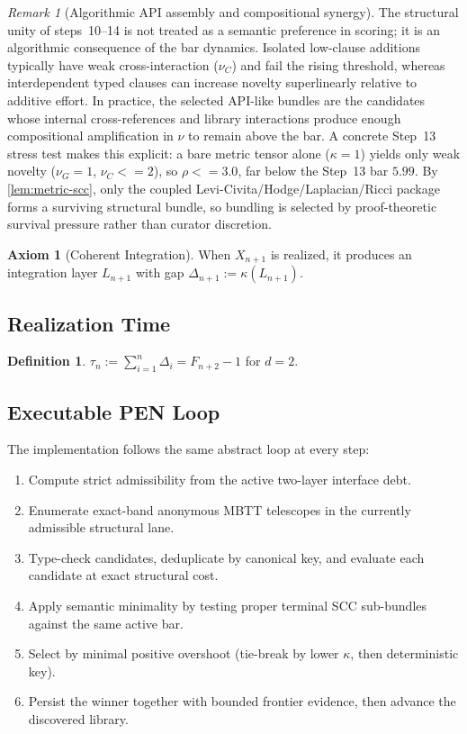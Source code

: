 \documentclass[11pt,a4paper]{article}
\def\leq{<=}%
\theoremstyle{plain}
\theoremstyle{definition}
\newtheorem{definition}[theorem]{Definition}
\newtheorem{axiom}[theorem]{Axiom}
\theoremstyle{remark}
\newtheorem{remark}[theorem]{Remark}
\begin{document}
\begin{remark}[Algorithmic API assembly and compositional synergy]
\label{rem:api-assembly}
The structural unity of steps~10--14 is not treated as a semantic preference in scoring; it is an algorithmic consequence of the bar dynamics.
Isolated low-clause additions typically have weak cross-interaction ($\nu_C$) and fail the rising threshold, whereas interdependent typed clauses can increase novelty superlinearly relative to additive effort.
In practice, the selected API-like bundles are the candidates whose internal cross-references and library interactions produce enough compositional amplification in $\nu$ to remain above the bar.
A concrete Step~13 stress test makes this explicit: a bare metric tensor alone ($\kappa=1$) yields only weak novelty ($\nu_G=1$, $\nu_C\leq 2$), so $\rho\leq 3.0$, far below the Step~13 bar $5.99$.
By \cref{lem:metric-scc}, only the coupled Levi-Civita/Hodge/Laplacian/Ricci package forms a surviving structural bundle, so bundling is selected by proof-theoretic survival pressure rather than curator discretion.
\end{remark}

\begin{axiom}[Coherent Integration]
\label{ax:integration}
When $X_{n+1}$ is realized, it produces an integration layer $L_{n+1}$ with gap $\Delta_{n+1} := \kappa(L_{n+1})$.
\end{axiom}

\subsection{Realization Time}

\begin{definition}
\label{def:tau}
$\tau_n := \sum_{i=1}^{n} \Delta_i = F_{n+2} - 1$ for $d = 2$.
\end{definition}

\subsection{Executable PEN Loop}
\label{sec:pen-loop}

The implementation follows the same abstract loop at every step:
\begin{enumerate}[nosep]
    \item Compute strict admissibility from the active two-layer interface debt.
    \item Enumerate exact-band anonymous MBTT telescopes in the currently admissible structural lane.
    \item Type-check candidates, deduplicate by canonical key, and evaluate each candidate at exact structural cost.
    \item Apply semantic minimality by testing proper terminal SCC sub-bundles against the same active bar.
    \item Select by minimal positive overshoot (tie-break by lower $\kappa$, then deterministic key).
    \item Persist the winner together with bounded frontier evidence, then advance the discovered library.
\end{enumerate}
\end{document}
